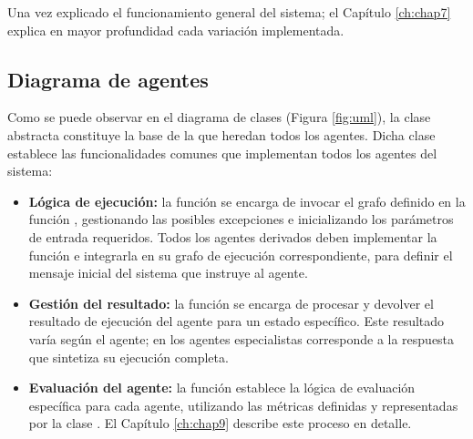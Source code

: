 Una vez explicado el funcionamiento general del sistema; el Capítulo \ref{ch:chap7} explica en mayor profundidad cada variación implementada.

\subsection{Diagrama de agentes}
\label{sec:diagrama_agentes}

Como se puede observar en el diagrama de clases (Figura \ref{fig:uml}), la clase abstracta  constituye la base de la que heredan todos los agentes. Dicha clase establece las funcionalidades comunes que implementan todos los agentes del sistema:

\begin{itemize}
\item \textbf{Lógica de ejecución:} la función  se encarga de invocar el grafo definido en la función , gestionando las posibles excepciones e inicializando los parámetros de entrada requeridos. Todos los agentes derivados deben implementar la función  e integrarla en su grafo de ejecución correspondiente, para definir el mensaje inicial del sistema que instruye al agente.
\item \textbf{Gestión del resultado:} la función  se encarga de procesar y devolver el resultado de ejecución del agente para un estado específico. Este resultado varía según el agente; en los agentes especialistas corresponde a la respuesta que sintetiza su ejecución completa.
\item \textbf{Evaluación del agente:} la función  establece la lógica de evaluación específica para cada agente, utilizando las métricas definidas y representadas por la clase . El Capítulo \ref{ch:chap9} describe este proceso en detalle.
\end{itemize}

